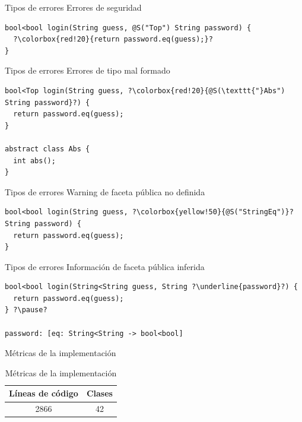 \documentclass[aspectratio=169,10pt]{beamer}
\begin{document}
\begin{frame}[fragile]{Tipos de errores}
	Errores de seguridad \\ \pause
	\vspace{1cm}
\begin{lstlisting}[escapechar=?,basicstyle=\fontsize{9}{9}\ttfamily]
bool<bool login(String guess, @S("Top") String password) {
  ?\colorbox{red!20}{return password.eq(guess);}?
}
\end{lstlisting}
\end{frame}

\begin{frame}[fragile]{Tipos de errores}
	Errores de tipo mal formado \\ \pause
	\vspace{1cm}
\begin{lstlisting}[escapechar=?,basicstyle=\fontsize{9}{9}\ttfamily]
bool<Top login(String guess, ?\colorbox{red!20}{@S(\texttt{"}Abs") String password}?) {
  return password.eq(guess);
}

abstract class Abs {
  int abs();
}
\end{lstlisting}
\end{frame}

\begin{frame}[fragile]{Tipos de errores}
	Warning de faceta pública no definida \\ \pause
	\vspace{1cm}
\begin{lstlisting}[escapechar=?,basicstyle=\fontsize{9}{9}\ttfamily]
bool<bool login(String guess, ?\colorbox{yellow!50}{@S("StringEq")}? String password) {
  return password.eq(guess);
}
\end{lstlisting}
\end{frame}

\begin{frame}[fragile]{Tipos de errores}
	Información de faceta pública inferida \\ \pause
	\vspace{1cm}
\begin{lstlisting}[escapechar=?,basicstyle=\fontsize{9}{9}\ttfamily]
bool<bool login(String<String guess, String ?\underline{password}?) {
  return password.eq(guess);
} ?\pause?

password: [eq: String<String -> bool<bool]
\end{lstlisting}
\end{frame}

\begin{frame}[fragile]{Métricas de la implementación}
	\begin{table}
		\caption{Métricas de la implementación}
		\begin{tabular}{c|c}
      Líneas de código & Clases\\
      \hline
      2866 & 42\\
		\end{tabular}
	\end{table}
\end{frame}
\end{document}
